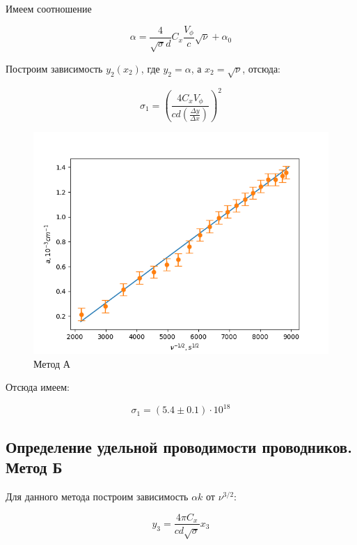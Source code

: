 \documentclass[a4paper]{article}
\begin{document}
Имеем соотношение

\begin{equation}
    \alpha = \frac{4}{\sqrt{\sigma}d}C_x\frac{V_\phi}{c}\sqrt{\nu} + \alpha_0
\end{equation}

Построим зависимость $y_2(x_2)$, где $y_2 = \alpha$, а $x_2 = \sqrt{\nu}$,
отсюда:

\begin{equation}
    \sigma_1 = \left( \frac{4C_xV_\phi}{cd \left( \frac{\Delta y}{\Delta x} \right)} \right)^2
\end{equation}

\begin{figure}[h!]
    \centering
    \includegraphics[width=0.6\pdfpagewidth]{graph3.png}
    \caption{Метод А}
\end{figure}

Отсюда имеем:

\begin{equation}
    \sigma_1 = (5.4 \pm 0.1) \cdot 10^{18}
\end{equation}

\subsection{Определение удельной проводимости проводников. Метод Б}

Для данного метода построим зависимость $\alpha k$ от $\nu^{3/2}$:

\begin{equation}
    y_3 = \frac{4\pi C_x}{cd\sqrt{\sigma}}x_3
\end{equation}
\end{document}
